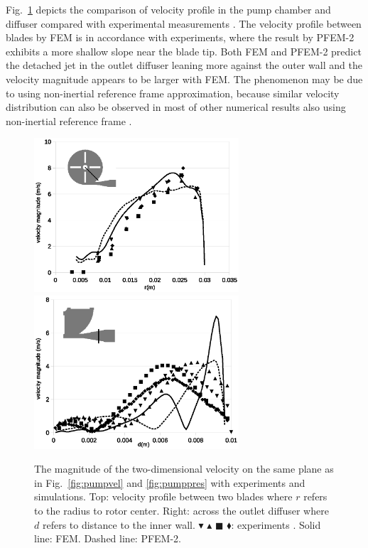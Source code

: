 Fig.~\ref{fig:pumpvelprofile} depicts the comparison of velocity profile in the pump chamber and diffuser compared with experimental measurements \cite{mali_cfd}. The velocity profile between blades by FEM is in accordance with experiments, where the result by PFEM-2 exhibits a more shallow slope near the blade tip. Both FEM and PFEM-2 predict the detached jet in the outlet diffuser leaning more against the outer wall and the velocity magnitude appears to be larger with FEM. The phenomenon may be due to using non-inertial reference frame approximation, because similar velocity distribution can also be observed in most of other numerical results also using non-inertial reference frame \cite{mali_cfd}. 
 
\begin{figure}[htbp]
    \centering
    \includegraphics[width=3in]{imgs/nozzle_pump/pump_velblade.eps}\\
    \vspace{.5cm}
    \includegraphics[width=3in]{imgs/nozzle_pump/pump_veldiffuser.eps}
    \caption{The magnitude of the two-dimensional velocity on the same plane as in Fig.~\ref{fig:pumpvel} and \ref{fig:pumppres} with experiments and simulations. Top: velocity profile between two blades where $r$ refers to the radius to rotor center. Right: across the outlet diffuser where $d$ refers to distance to the inner wall. $\blacktriangledown$ $\blacktriangle$ $\blacksquare$ $\blacklozenge$: experiments \cite{mali_cfd}. Solid line: FEM. Dashed line: PFEM-2. }
    \label{fig:pumpvelprofile}
\end{figure}
